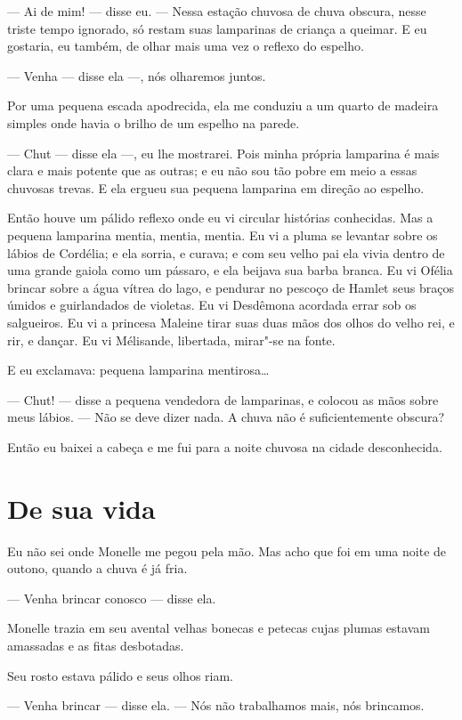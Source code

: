 --- Ai de mim! --- disse eu. --- Nessa estação chuvosa de chuva obscura, nesse
triste tempo ignorado, só restam suas lamparinas de criança a queimar. E eu
gostaria, eu também, de olhar mais uma vez o reflexo do espelho.

--- Venha --- disse ela ---, nós olharemos juntos.

Por uma pequena escada apodrecida, ela me \mbox{conduziu} a um quarto de
madeira simples onde havia o brilho de um espelho na parede.

--- Chut --- disse ela ---, eu lhe mostrarei. Pois minha própria lamparina é
mais clara e mais potente que as outras; e eu não sou tão pobre em meio a
essas chuvosas trevas. E ela ergueu sua pequena lamparina em direção ao
espelho.

Então houve um pálido reflexo onde eu vi circular histórias conhecidas.
Mas a pequena lamparina mentia, mentia, mentia. Eu vi a pluma se levantar
sobre os lábios de Cordélia; e ela sorria, e curava; e com seu velho pai
ela vivia dentro de uma grande gaiola como um pássaro, e ela beijava sua
barba branca. Eu vi Ofélia brincar sobre a água vítrea do lago, e pendurar
no pescoço de Hamlet seus braços úmidos e guirlandados de violetas. Eu vi
Desdêmona acordada errar sob os salgueiros. Eu vi a princesa Maleine tirar
suas duas mãos dos olhos do velho rei, e rir, e dançar. Eu vi Mélisande,
libertada, mirar"-se na fonte.

E eu exclamava: pequena lamparina mentirosa\ldots{}

--- Chut! --- disse a pequena vendedora de lamparinas, e colocou as mãos
sobre meus lábios.  --- Não se deve dizer nada. A chuva não é suficientemente
obscura?

Então eu baixei a cabeça e me fui para a noite chuvosa na cidade
desconhecida.

\section*{De sua vida}

Eu não sei onde Monelle me pegou pela mão. Mas acho que foi em uma
noite de outono, quando a chuva é já fria.

--- Venha brincar conosco --- disse ela.

Monelle trazia em seu avental velhas bonecas e petecas cujas plumas
estavam amassadas e as fitas desbotadas.

Seu rosto estava pálido e seus olhos riam.

--- Venha brincar --- disse ela.  --- Nós não trabalhamos mais, nós brincamos.

